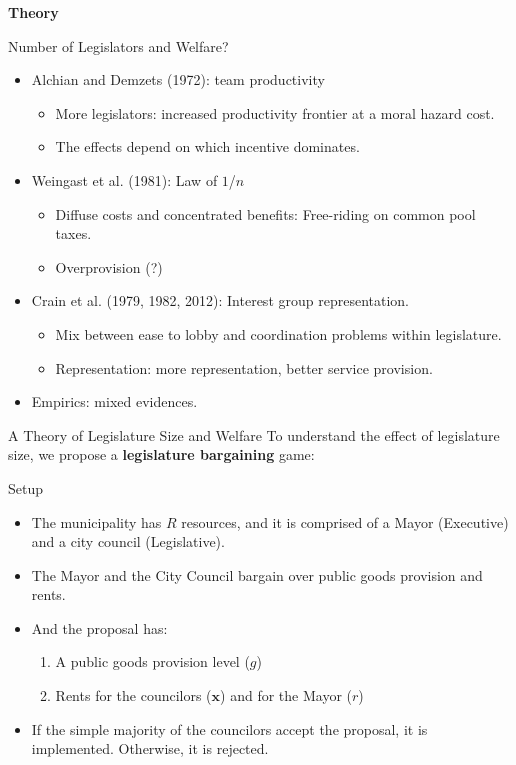 \documentclass[11pt]{beamer}
\begin{document}
\begin{frame}
\begin{center}
\Large{\textbf{Theory}}
\end{center}
\end{frame}

\begin{frame}{Number of Legislators and Welfare?}
  \begin{itemize} \itemsep1em
   \item Alchian and Demzets (1972): team productivity
   \begin{itemize}
       \item More legislators: increased productivity frontier at a moral hazard cost.
       \item The effects depend on which incentive dominates.
   \end{itemize}
   \item Weingast et al. (1981): Law of $1$/$n$
   \begin{itemize}
       \item Diffuse costs and concentrated benefits: Free-riding on common pool taxes.
       \item Overprovision (?)
   \end{itemize}
   \item Crain et al. (1979, 1982, 2012): Interest group representation.
   \begin{itemize}
       \item Mix between ease to lobby and coordination problems within legislature.
       \item Representation: more representation, better service provision.
   \end{itemize}
   \item Empirics: mixed evidences.
  \end{itemize}
\end{frame}

\begin{frame}{A Theory of Legislature Size and Welfare}
To understand the effect of legislature size, we 
propose a \textbf{legislature bargaining} game:
\begin{block}{Setup}
\begin{itemize}\itemsep1em
    \item The municipality has $R$ resources, and it is comprised of a Mayor (Executive) and a city council (Legislative).
    \item The Mayor and the City Council bargain over public goods provision and rents.
    \item And the proposal has:
    \begin{enumerate}\itemsep1em
     \item A public goods provision level ($g$)
     \item Rents for the councilors ($\textbf{x}$) and for the Mayor ($r$)
    \end{enumerate}
    \item If the simple majority of the councilors accept the proposal, it is implemented. Otherwise, it is rejected.
\end{itemize}
\end{block}
\end{frame}
\end{document}
